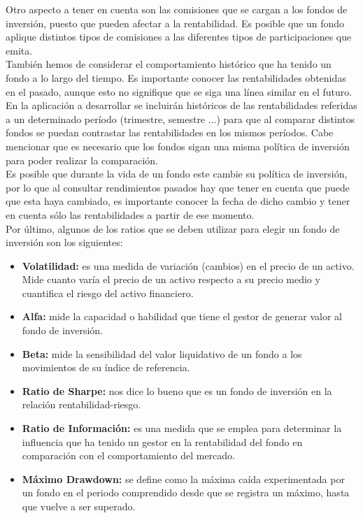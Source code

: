 \documentclass[12pt, a4paper]{article}
\begin{document}
Otro aspecto a tener en cuenta son las comisiones que se cargan a los fondos de inversión, puesto que pueden afectar a la rentabilidad. Es posible que un fondo aplique distintos tipos de comisiones a las diferentes tipos de participaciones que emita.\\

También hemos de considerar el comportamiento histórico que ha tenido un fondo a lo largo del tiempo. Es importante conocer las rentabilidades obtenidas en el pasado, aunque esto no signifique que se siga una línea similar en el futuro. En la aplicación a desarrollar se incluirán históricos de las rentabilidades referidas a un determinado período (trimestre, semestre ...) para que al comparar distintos fondos se puedan contrastar las rentabilidades en los mismos períodos. Cabe mencionar que es necesario que los fondos sigan una misma política de inversión para poder realizar la comparación.\\

Es posible que durante la vida de un fondo este cambie su política de inversión, por lo que al consultar rendimientos pasados hay que tener en cuenta que puede que esta haya cambiado,  es importante conocer la fecha de dicho cambio y tener en cuenta sólo las rentabilidades a partir de ese momento.\\

Por último, algunos de los ratios que se deben utilizar para elegir un fondo de inversión son los siguientes:

\begin{itemize}
	\item \textbf{Volatilidad:} es una medida de variación (cambios) en el precio de un activo. Mide cuanto varía el precio de un activo respecto a su precio medio y cuantifica el riesgo del activo financiero.
	\item \textbf{Alfa:} mide la capacidad o habilidad que tiene el gestor de generar valor al fondo de inversión.
	\item \textbf{Beta:} mide la sensibilidad del valor liquidativo de un fondo a los movimientos de su índice de referencia.
	\item \textbf{Ratio de Sharpe:} nos dice lo bueno que es un fondo de inversión en la relación rentabilidad-riesgo.
	\item \textbf{Ratio de Información:}  es una medida que se emplea para determinar la influencia que ha tenido un gestor en la rentabilidad del fondo en comparación con el comportamiento del mercado.
	\item \textbf{Máximo Drawdown:} se define como la máxima caída experimentada por un fondo en el periodo comprendido desde que se registra un máximo, hasta que vuelve a ser superado.
\end{itemize}
\end{document}
